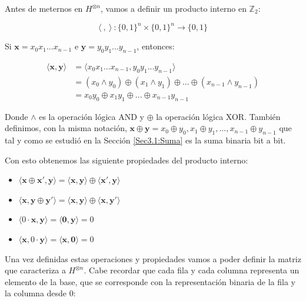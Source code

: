  Antes de meternos en $H^{\otimes n}$, vamos a definir un producto interno en $\mathbb{Z}_{2}$:

 \begin{equation*}
     \langle\:,\:\rangle\::\{0,1\}^{n} \times \{0,1\}^{n} \rightarrow \{0,1\}\end{equation*}

 Si $\mathbf{x}=x_{0}x_{1}...x_{n-1}$ e $\mathbf{y}=y_{0}y_{1}...y_{n-1}$, entonces:

 \begin{equation}
     \begin{split}
     \langle\mathbf{x},\mathbf{y}\rangle &= \langle x_{0}x_{1}...x_{n-1},y_{0}y_{1}...y_{n-1}\rangle \\ &= (x_{0}\land y_{0})\oplus(x_{1}\land y_{1})\oplus...\oplus(x_{n-1}\land y_{n-1}) \\ &= x_{0}y_{0}\oplus x_{1}y_{1}\oplus ... \oplus x_{n-1}y_{n-1}
     \end{split}
 \end{equation}

 Donde $\land$ es la operación lógica AND y $\oplus$ la operación lógica XOR. También definimos, con la misma notación,  $\mathbf{x}\oplus\mathbf{y}=x_{0}\oplus y_{0},x_{1}\oplus y_{1},...,x_{n-1}\oplus y_{n-1}$ que tal y como se estudió en la Sección \ref{Sec3.1:Suma} es la suma binaria bit a bit.\newline

 Con esto obtenemos las siguiente propiedades del producto interno:

 \begin{itemize}
     \item $\langle \mathbf{x} \oplus \mathbf{x}',\mathbf{y}\rangle=\langle \mathbf{x},\mathbf{y}\rangle \oplus \langle \mathbf{x}',\mathbf{y}\rangle$

     \item $\langle \mathbf{x},\mathbf{y} \oplus \mathbf{y}'\rangle=\langle \mathbf{x},\mathbf{y}\rangle \oplus \langle \mathbf{x},\mathbf{y}'\rangle$

     \item $\langle 0\cdot \mathbf{x},\mathbf{y}\rangle=\langle\mathbf{0},\mathbf{y}\rangle=0$

     \item $\langle \mathbf{x}, 0 \cdot \mathbf{y}\rangle=\langle \mathbf{x},\mathbf{0}\rangle=0$
 \end{itemize}

 Una vez definidas estas operaciones y propiedades vamos a poder definir la matriz que caracteriza a $H^{\otimes n}$. Cabe recordar que cada fila y cada columna representa un elemento de la base, que se corresponde con la representación binaria de la fila y la columna desde 0:
 
